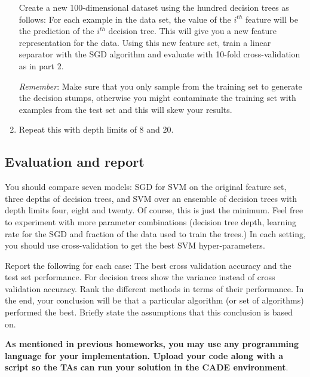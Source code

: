 \begin{enumerate}
  Create a new 100-dimensional dataset using the hundred decision
  trees as follows: For each example in the data set, the value of the
  $i^{th}$ feature will be the prediction of the $i^{th}$ decision
  tree. This will give you a new feature representation for the data.
  Using this new feature set, train a linear separator with the SGD
  algorithm and evaluate with 10-fold cross-validation as in part 2.


  {\em Remember}: Make sure that you only sample from the training set
  to generate the decision stumps, otherwise you might contaminate the
  training set with examples from the test set and this will skew your
  results.

\item Repeat this with depth limits of 8 and 20.

\end{enumerate}


\subsection{Evaluation and report}

You should compare seven models: SGD for SVM on the original feature
set, three depths of decision trees, and SVM over an ensemble of decision trees with depth limits four,
eight and twenty. Of course, this is just the minimum. Feel free to
experiment with more parameter combinations (decision tree depth,
learning rate for the SGD and fraction of the data used to train the
trees.) In each setting, you should use cross-validation to get the
best SVM hyper-parameters.

Report the following for each case: The best cross validation accuracy
and the test set performance. For decision trees show the variance instead of cross validation accuracy. Rank the different methods in terms of
their performance. In the end, your conclusion will be that a
particular algorithm (or set of algorithms) performed the best.
Briefly state the assumptions that this conclusion is based on.

{\bf As mentioned in previous homeworks, you may use any programming
  language for your implementation. Upload your code along with a
  script so the TAs can run your solution in the CADE environment}.




